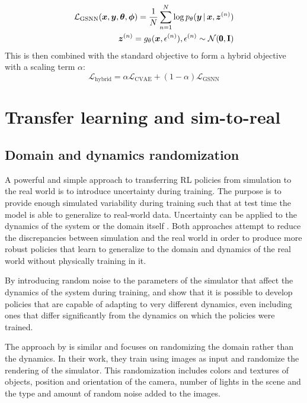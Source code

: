 \begin{equation}
\begin{split}
\mathcal{L}_{\text{GSNN}}(\vx, \vy, \vth, \vph) = \frac{1}{N} \sum_{n=1}^N \log p_\theta \given{\vy}{\vx, \vz^{(n)}}
\\
\vz^{(n)} = g_{\theta}(\vx, \epsilon^{(n)}), \epsilon^{(n)} \sim \mathcal{N}(\pmb{0}, \mathbf{I})
\end{split}
\end{equation}
This is then combined with the standard \cvae{} objective to form a hybrid objective with a scaling term $\alpha$:
\begin{equation}
\mathcal{L}_{\text{hybrid}} = \alpha \mathcal{L}_{\text{CVAE}} + (1 - \alpha) \mathcal{L}_{\text{GSNN}}
\end{equation}

\section{Transfer learning and sim-to-real}
\subsection{Domain and dynamics randomization}

A powerful and simple approach to transferring RL policies from simulation to the real world is to introduce uncertainty during training. The purpose is to provide enough simulated variability during training such that at test time the model is able to generalize to real-world data. Uncertainty can be applied to the dynamics of the system \parencite{Antonova2017}\parencite{peng} or the domain itself \parencite{tobin}. Both approaches attempt to reduce the discrepancies between simulation and the real world in order to produce more robust policies that learn to generalize to the domain and dynamics of the real world without physically training in it. 

By introducing random noise to the parameters of the simulator that affect the dynamics of the system during training, \parencite{Antonova2017} and \parencite{peng} show that it is possible to develop policies that are capable of adapting to very different dynamics, even including ones that differ significantly from the dynamics on which the policies were trained.

The approach by \parencite{tobin} is similar and focuses on randomizing the domain rather than the dynamics. In their work, they train using images as input and randomize the rendering of the simulator. This randomization includes colors and textures of objects, position and orientation of the camera, number of lights in the scene and the type and amount of random noise added to the images.

